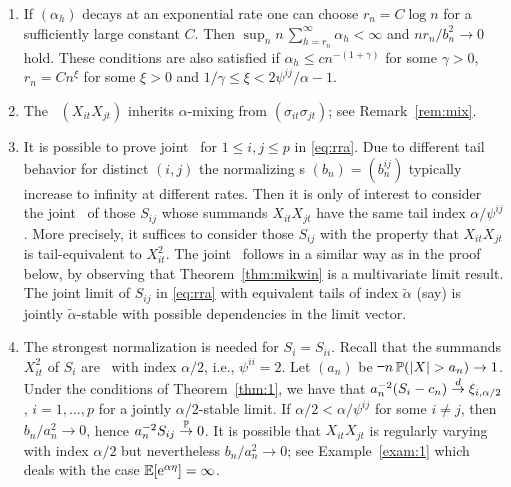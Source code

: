 \begin{enumerate}
\item
If $(\alpha_h)$ decays  at an exponential rate one can choose $r_n= C\log n$ for a sufficiently large constant $C$. Then
  $\sup _n n\,\sum_{h=r_n}^\infty \alpha_h<\infty$ and $nr_n/b_n^2\to 0$ hold. These conditions are also satisfied if
$\alpha_h\le c n^{-(1+\gamma)}$ for some $\gamma>0$, $r_n=C n^\xi$  for some
$\xi>0$ and $1/\gamma\le \xi< 2\psi^{ij}/\alpha-1$.
\item
The \seq\ $(X_{it}X_{jt})$ inherits $\alpha$-mixing from $(\sigma_{it}\sigma_{jt})$; see Remark~\ref{rem:mix}.
\item It is possible to prove joint \con\ for $1\le i,j\le p$ in \eqref{eq:rra}. Due to different tail behavior for
distinct $(i,j)$ the normalizing \seq s $(b_n)=(b_n^{ij})$ typically increase to infinity at different rates. Then it is only of interest
to consider the joint \con\ of those $S_{ij}$ whose summands $X_{it}X_{jt}$ have the same tail index $\alpha/\psi^{ ij}$. More
precisely, it suffices to consider those $S_{ij}$ with the property that $X_{it}X_{jt}$ is tail-equivalent to $X_{it}^2$. 
The joint \con\ follows in a similar way as in the proof below, by observing
that Theorem~\ref{thm:mikwin} is a multivariate limit result. 
The joint limit of $S_{ij}$ in \eqref{eq:rra} with equivalent tails of index $\tilde{\alpha}$ (say) is
jointly $\tilde{\alpha}$-stable with possible dependencies in the limit vector. 
\item
The strongest normalization is needed for $S_i=S_{ii}$. Recall that the summands $X_{it}^2$ of $S_i$ are \regvary\ with index 
$\alpha/2$, i.e., $\psi^{ii}=2$. Let $(a_n)$ be \st\ $n\,\P(|X|>a_n)\to 1$.
Under the conditions of Theorem~\ref{thm:1}, we have that $a_n^{-2}(S_i-c_n)\stackrel{d}{\rightarrow} \xi_{i,\alpha/2}$, $i=1,\ldots,p$ 
for a jointly $\alpha/2$-stable limit.  If
$\alpha/2<\alpha/\psi^{ij}$ for some $i\ne j$, then $b_n/a_n^2\to 0$, hence $a_n^{-2} S_{ij}\stackrel{{\mathbb P}}{\rightarrow} 0$. It is possible that $X_{it}X_{jt}$
is regularly varying with index $\alpha/2$ but nevertheless $b_n/a_n^2\to 0$; see Example~\ref{exam:1} 
which deals with the case ${\mathbb E} [{\rm e}^{\alpha \eta}]=\infty$.
\end{enumerate}
